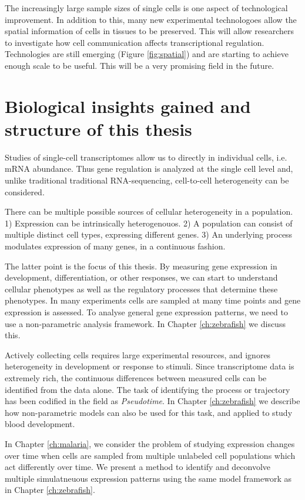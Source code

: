 The increasingly large sample sizes of single cells is one aspect of technological improvement. In addition to this, many new experimental technologoes allow the spatial information of cells in tissues to be preserved. This will allow researchers to investigate how cell communication affects transcriptional regulation. Technologies are still emerging (Figure \ref{fig:spatial}) and are starting to achieve enough scale to be useful. This will be a very promising field in the future.

\section{Biological insights gained and structure of this thesis}

Studies of single-cell transcriptomes allow us to directly in individual cells, i.e. mRNA abundance. Thus gene regulation is analyzed at the single cell level and, unlike traditional traditional RNA-sequencing, cell-to-cell heterogeneity can be considered.

There can be multiple possible sources of cellular heterogeneity in a population. 1) Expression can be intrinsically heterogenouos. 2) A population can consist of multiple distinct cell types, expressing different genes. 3) An underlying process modulates expression of many genes, in a continuous fashion.

The latter point is the focus of this thesis. By measuring gene expression in development, differentiation, or other responses, we can start to understand cellular phenotypes as well as the regulatory processes that determine these phenotypes. In many experiments cells are sampled at many time points and gene expression is assessed. To analyse general gene expression patterns, we need to use a non-parametric analysis framework. In Chapter \ref{ch:zebrafish} we discuss this.

Actively collecting cells requires large experimental resources, and ignores heterogeneity in development or response to stimuli. Since transcriptome data is extremely rich, the continuous differences between measured cells can be identified from the data alone. The task of identifying the process or trajectory has been codified in the field as \textit{Pseudotime}. In Chapter \ref{ch:zebrafish} we describe how non-parametric models can also be used for this task, and applied to study blood development.

In Chapter \ref{ch:malaria}, we consider the problem of studying expression changes over time when cells are sampled from multiple unlabeled cell populations which act differently over time. We present a method to identify and deconvolve multiple simulatneuous expression patterns using the same model framework as in Chapter \ref{ch:zebrafish}.


